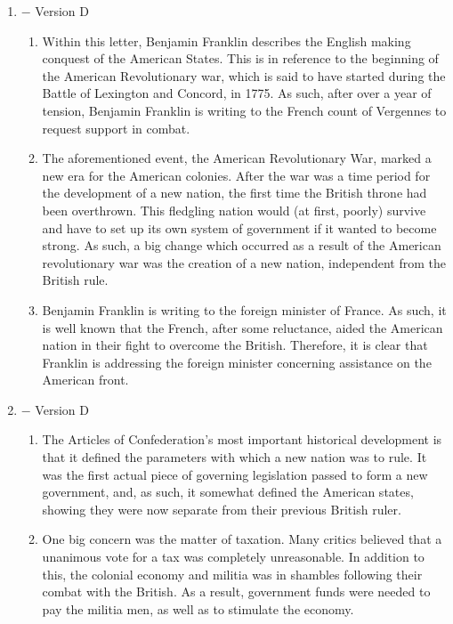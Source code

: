 \documentclass[12pt]{article}
\begin{document}
\begin{enumerate}

  \item $-$ Version D

    \begin{enumerate}

      \item Within this letter, Benjamin Franklin describes the English making conquest of the American States. This is in reference to the beginning of the American Revolutionary war, which is said to have started during the Battle of Lexington and Concord, in 1775. As such, after over a year of tension, Benjamin Franklin is writing to the French count of Vergennes to request support in combat.

      \item The aforementioned event, the American Revolutionary War, marked a new era for the American colonies. After the war was a time period for the development of a new nation, the first time the British throne had been overthrown. This fledgling nation would (at first, poorly) survive and have to set up its own system of government if it wanted to become strong. As such, a big change which occurred as a result of the American revolutionary war was the creation of a new nation, independent from the British rule.

      \item Benjamin Franklin is writing to the foreign minister of France. As such, it is well known that the French, after some reluctance, aided the American nation in their fight to overcome the British. Therefore, it is clear that Franklin is addressing the foreign minister concerning assistance on the American front.

    \end{enumerate}

  \item $-$ Version D

    \begin{enumerate}

      \item The Articles of Confederation's most important historical development is that it defined the parameters with which a new nation was to rule. It was the first actual piece of governing legislation passed to form a new government, and, as such, it somewhat defined the American states, showing they were now separate from their previous British ruler.

      \item One big concern was the matter of taxation. Many critics believed that a unanimous vote for a tax was completely unreasonable. In addition to this, the colonial economy and militia was in shambles following their combat with the British. As a result, government funds were needed to pay the militia men, as well as to stimulate the economy.


\end{enumerate}
\end{enumerate}
\end{document}
